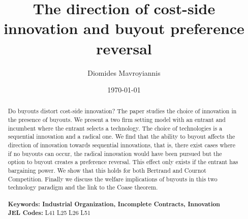 \documentclass[12pt]{report}
\numberwithin{equation}{section}
\begin{document}
\begin{titlepage}
\title{The direction of cost-side innovation and buyout preference reversal}
\author{Diomides Mavroyiannis}
\date{\today}
\maketitle



\begin{abstract}
\noindent Do buyouts distort cost-side innovation?
The paper studies the choice of innovation in the presence of buyouts. We present a two firm setting model with an entrant and incumbent where the entrant selects a technology. The choice of technologies is a sequential innovation and a radical one. We find that the ability to buyout affects the direction of innovation towards sequential innovations, that is, there exist cases where if no buyouts can occur, the radical innovation would have been pursued but the option to buyout creates a preference reversal. This effect only exists if the entrant has bargaining power. We show that this holds for both Bertrand and Cournot Competition. Finally we discuss the welfare implications of buyouts in this two technology paradigm and the link to the Coase theorem. 
\\
\\
\noindent\textbf{Keywords: Industrial Organization, Incomplete Contracts, Innovation}
\\
\noindent\textbf{JEL Codes:} L41 L25 L26 L51 \\

\bigskip
\end{abstract}
\setcounter{page}{0}
\thispagestyle{empty}
\end{titlepage}
\pagebreak \newpage
\end{document}
